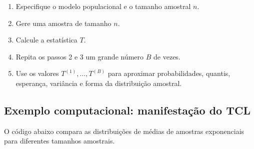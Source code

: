 \documentclass[
  letterpaper,
  DIV=11,
  numbers=noendperiod]{scrreprt}
\providecommand{\tightlist}{%
  \setlength{\itemsep}{0pt}\setlength{\parskip}{0pt}}\usepackage{longtable,booktabs,array}
\begin{document}
\begin{tcolorbox}[enhanced jigsaw, colback=white, leftrule=.75mm, colbacktitle=quarto-callout-important-color!10!white, breakable, titlerule=0mm, bottomtitle=1mm, title=\textcolor{quarto-callout-important-color}{\faExclamation}\hspace{0.5em}{Procedimento --- Simulação de Monte Carlo}, colframe=quarto-callout-important-color-frame, toprule=.15mm, opacityback=0, bottomrule=.15mm, opacitybacktitle=0.6, arc=.35mm, toptitle=1mm, rightrule=.15mm, coltitle=black, left=2mm]

\begin{enumerate}
\def\labelenumi{\arabic{enumi}.}
\tightlist
\item
  Especifique o modelo populacional e o tamanho amostral \(n\).
\item
  Gere uma amostra de tamanho \(n\).
\item
  Calcule a estatística \(T\).
\item
  Repita os passos 2 e 3 um grande número \(B\) de vezes.
\item
  Use os valores \(T^{(1)},\ldots,T^{(B)}\) para aproximar
  probabilidades, quantis, esperança, variância e forma da distribuição
  amostral.
\end{enumerate}

\end{tcolorbox}

\subsection*{Exemplo computacional: manifestação do
TCL}\label{exemplo-computacional-manifestauxe7uxe3o-do-tcl}

O código abaixo compara as distribuições de médias de amostras
exponenciais para diferentes tamanhos amostrais.
\end{document}

